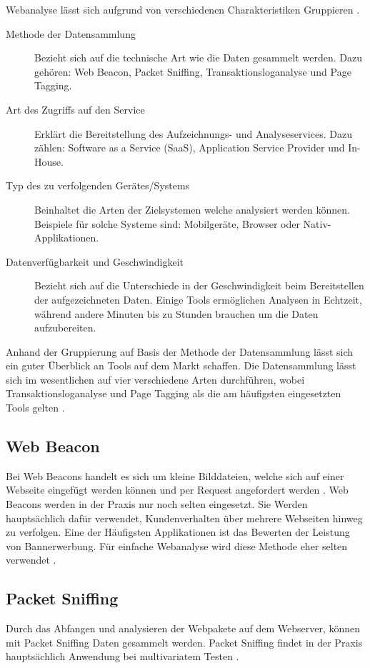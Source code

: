 Webanalyse lässt sich aufgrund von verschiedenen Charakteristiken Gruppieren \parencite[S. 172-174]{nakatani2011toolselectionmethod}.

\begin{description}
  \item[Methode der Datensammlung] Bezieht sich auf die technische Art wie die Daten gesammelt werden. Dazu gehören: Web Beacon, Packet Sniffing, Transaktionsloganalyse und Page Tagging.  
  \item[Art des Zugriffs auf den Service] Erklärt die Bereitstellung des Aufzeichnungs- und Analyseservices. Dazu zählen: Software as a Service (SaaS), Application Service Provider und In-House.
  \item[Typ des zu verfolgenden Gerätes/Systems] Beinhaltet die Arten der Zielsystemen welche analysiert werden können. Beispiele für solche Systeme sind: Mobilgeräte, Browser oder Nativ-Applikationen.
  \item[Datenverfügbarkeit und Geschwindigkeit] Bezieht sich auf die Unterschiede in der Geschwindigkeit beim Bereitstellen der aufgezeichneten Daten. Einige Tools ermöglichen Analysen in Echtzeit, während andere Minuten bis zu Stunden brauchen um die Daten aufzubereiten.
\end{description}

Anhand der Gruppierung auf Basis der Methode der Datensammlung lässt sich ein guter Überblick an Tools auf dem Markt schaffen. Die Datensammlung lässt sich im wesentlichen auf vier verschiedene Arten durchführen, wobei Transaktionsloganalyse und Page Tagging als die am häufigsten eingesetzten Tools gelten \parencite{nakatani2011toolselectionmethod}.

\subsection{Web Beacon} 
Bei Web Beacons handelt es sich um kleine Bilddateien, welche sich auf einer Webseite eingefügt werden können und per Request angefordert werden \parencite[S. 173]{nakatani2011toolselectionmethod}. Web Beacons werden in der Praxis nur noch selten eingesetzt. Sie Werden hauptsächlich dafür verwendet, Kundenverhalten über mehrere Webseiten hinweg zu verfolgen. Eine der Häufigsten Applikationen ist das Bewerten der Leistung von Bannerwerbung. Für einfache Webanalyse wird diese Methode eher selten verwendet \parencite[S. 3]{waisberg2009webShort}.

\subsection{Packet Sniffing}
Durch das Abfangen und analysieren der Webpakete auf dem Webserver, können mit Packet Sniffing Daten gesammelt werden. Packet Sniffing findet in der Praxis hauptsächlich Anwendung bei multivariatem Testen \parencite[S. 4]{waisberg2009webShort}.

